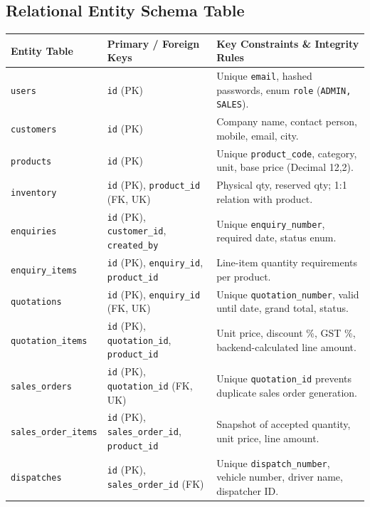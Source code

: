 \documentclass[11pt,a4paper]{article}
\begin{document}
\subsection{Relational Entity Schema Table}
\begin{table}[htbp]
\centering
\small
\begin{tabularx}{\textwidth}{l l X}
\toprule
\textbf{Entity Table} & \textbf{Primary / Foreign Keys} & \textbf{Key Constraints \& Integrity Rules} \\
\midrule
\texttt{users} & \texttt{id} (PK) & Unique \texttt{email}, hashed passwords, enum \texttt{role} (\texttt{ADMIN, SALES}). \\
\texttt{customers} & \texttt{id} (PK) & Company name, contact person, mobile, email, city. \\
\texttt{products} & \texttt{id} (PK) & Unique \texttt{product\_code}, category, unit, base price (Decimal 12,2). \\
\texttt{inventory} & \texttt{id} (PK), \texttt{product\_id} (FK, UK) & Physical qty, reserved qty; 1:1 relation with product. \\
\texttt{enquiries} & \texttt{id} (PK), \texttt{customer\_id}, \texttt{created\_by} & Unique \texttt{enquiry\_number}, required date, status enum. \\
\texttt{enquiry\_items} & \texttt{id} (PK), \texttt{enquiry\_id}, \texttt{product\_id} & Line-item quantity requirements per product. \\
\texttt{quotations} & \texttt{id} (PK), \texttt{enquiry\_id} (FK, UK) & Unique \texttt{quotation\_number}, valid until date, grand total, status. \\
\texttt{quotation\_items} & \texttt{id} (PK), \texttt{quotation\_id}, \texttt{product\_id} & Unit price, discount \%, GST \%, backend-calculated line amount. \\
\texttt{sales\_orders} & \texttt{id} (PK), \texttt{quotation\_id} (FK, UK) & Unique \texttt{quotation\_id} prevents duplicate sales order generation. \\
\texttt{sales\_order\_items} & \texttt{id} (PK), \texttt{sales\_order\_id}, \texttt{product\_id} & Snapshot of accepted quantity, unit price, line amount. \\
\texttt{dispatches} & \texttt{id} (PK), \texttt{sales\_order\_id} (FK) & Unique \texttt{dispatch\_number}, vehicle number, driver name, dispatcher ID. \\
\bottomrule
\end{tabularx}
\end{table}
\end{document}
